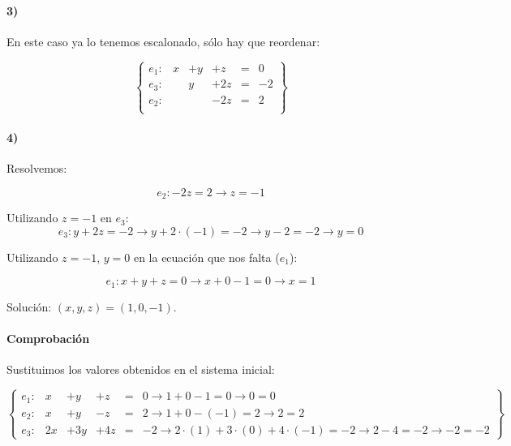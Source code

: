 \documentclass[palatino,nosec]{Docencia}
\begin{document}
\begin{problem}
\paragraph{3)}

En este caso ya lo tenemos escalonado, sólo hay que reordenar:

\[
\left\{\begin{array}{lccccc}
e_1: &x&+y&+z&=&0\\
e_3: &&y&+2z&=&-2\\
e_2: &&&-2z&=&2\\
\end{array}\right\}
\]


\paragraph{4)} Resolvemos:

\[e_2: -2z=2 \to z=-1\]


Utilizando $z=-1$ en $e_3$:
\[e_3: y+2z=-2 \to y+2·(-1) = -2 \to y-2=-2 \to y=0\]

Utilizando $z=-1$, $y=0$ en la ecuación que nos falta ($e_1$):

\[
e_1: x+y+z=0 \to x+0-1=0 \to x=1
\]


Solución: $(x,y,z) = (1,0,-1)$.

\paragraph*{Comprobación}

Sustituimos los valores obtenidos en el sistema inicial:

\[
\left\{\begin{array}{lccccl}
e_1: &x&+y&+z&=&0 \to 1+0-1=0 \to 0=0\\
e_2: &x&+y&-z&=&2 \to 1+0-(-1) = 2 \to 2=2 \\
e_3: &2x&+3y&+4z&=&-2 \to 2·(1) + 3·(0) + 4·(-1) = -2 \to  2-4=-2 \to -2=-2
\end{array}\right\}
\]

\end{problem}
\end{document}
